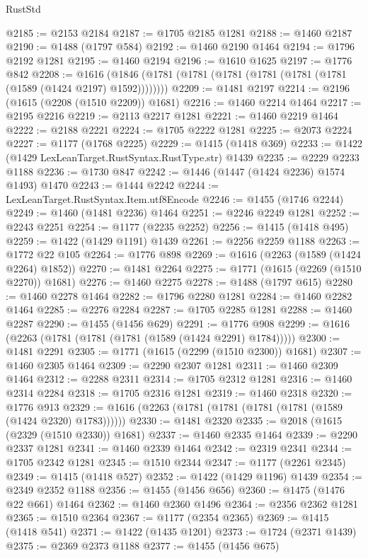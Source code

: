 \begin{lexlean}{RustStd}
\begin{coremodule}
@2185 := @2153 @2184
@2187 := @1705 @2185 @1281
@2188 := @1460 @2187
@2190 := @1488 (@1797 @584)
@2192 := @1460 @2190 @1464
@2194 := @1796 @2192 @1281
@2195 := @1460 @2194
@2196 := @1610 @1625
@2197 := @1776 @842
@2208 := @1616 (@1846 (@1781 (@1781 (@1781 (@1781 (@1781 (@1781 (@1589 (@1424 @2197) @1592))))))))
@2209 := @1481 @2197
@2214 := @2196 (@1615 (@2208 (@1510 @2209)) @1681)
@2216 := @1460 @2214 @1464
@2217 := @2195 @2216
@2219 := @2113 @2217 @1281
@2221 := @1460 @2219 @1464
@2222 := @2188 @2221
@2224 := @1705 @2222 @1281
@2225 := @2073 @2224
@2227 := @1177 (@1768 @2225)
@2229 := @1415 (@1418 @369)
@2233 := @1422 (@1429 LexLeanTarget.RustSyntax.RustType.str) @1439
@2235 := @2229 @2233 @1188
@2236 := @1730 @847
@2242 := @1446 (@1447 (@1424 @2236) @1574 @1493) @1470
@2243 := @1444 @2242
@2244 := LexLeanTarget.RustSyntax.Item.utf8Encode
@2246 := @1455 (@1746 @2244)
@2249 := @1460 (@1481 @2236) @1464
@2251 := @2246 @2249 @1281
@2252 := @2243 @2251
@2254 := @1177 (@2235 @2252)
@2256 := @1415 (@1418 @495)
@2259 := @1422 (@1429 @1191) @1439
@2261 := @2256 @2259 @1188
@2263 := @1772 @22 @105
@2264 := @1776 @898
@2269 := @1616 (@2263 (@1589 (@1424 @2264) @1852))
@2270 := @1481 @2264
@2275 := @1771 (@1615 (@2269 (@1510 @2270)) @1681)
@2276 := @1460 @2275
@2278 := @1488 (@1797 @615)
@2280 := @1460 @2278 @1464
@2282 := @1796 @2280 @1281
@2284 := @1460 @2282 @1464
@2285 := @2276 @2284
@2287 := @1705 @2285 @1281
@2288 := @1460 @2287
@2290 := @1455 (@1456 @629)
@2291 := @1776 @908
@2299 := @1616 (@2263 (@1781 (@1781 (@1781 (@1589 (@1424 @2291) @1784)))))
@2300 := @1481 @2291
@2305 := @1771 (@1615 (@2299 (@1510 @2300)) @1681)
@2307 := @1460 @2305 @1464
@2309 := @2290 @2307 @1281
@2311 := @1460 @2309 @1464
@2312 := @2288 @2311
@2314 := @1705 @2312 @1281
@2316 := @1460 @2314 @2284
@2318 := @1705 @2316 @1281
@2319 := @1460 @2318
@2320 := @1776 @913
@2329 := @1616 (@2263 (@1781 (@1781 (@1781 (@1781 (@1589 (@1424 @2320) @1783))))))
@2330 := @1481 @2320
@2335 := @2018 (@1615 (@2329 (@1510 @2330)) @1681)
@2337 := @1460 @2335 @1464
@2339 := @2290 @2337 @1281
@2341 := @1460 @2339 @1464
@2342 := @2319 @2341
@2344 := @1705 @2342 @1281
@2345 := @1510 @2344
@2347 := @1177 (@2261 @2345)
@2349 := @1415 (@1418 @527)
@2352 := @1422 (@1429 @1196) @1439
@2354 := @2349 @2352 @1188
@2356 := @1455 (@1456 @656)
@2360 := @1475 (@1476 @22 @661) @1464
@2362 := @1460 @2360 @1496
@2364 := @2356 @2362 @1281
@2365 := @1510 @2364
@2367 := @1177 (@2354 @2365)
@2369 := @1415 (@1418 @541)
@2371 := @1422 (@1435 @1201)
@2373 := @1724 (@2371 @1439)
@2375 := @2369 @2373 @1188
@2377 := @1455 (@1456 @675)

\end{coremodule}
\end{lexlean}
